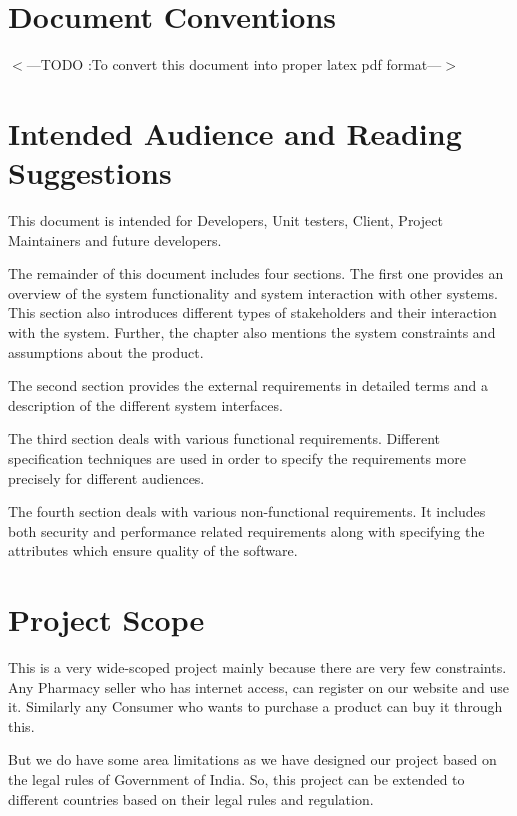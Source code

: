 \documentclass{scrreprt}
\begin{document}
\section{Document Conventions}
$<$---TODO :To convert this document into proper latex pdf format---$>$

\section{Intended Audience and Reading Suggestions}
\item This document is intended for Developers, Unit testers, Client, Project Maintainers and future developers.\\

\item The remainder of this document includes four sections.
The first one provides an overview of the system functionality and system interaction with other systems. This section also introduces different types of stakeholders and their interaction with the system. Further, the chapter also mentions the system constraints and assumptions about the product.\\

\item The second section provides the external requirements in detailed terms and a description of the different system interfaces.\\

\item The third section deals with various functional requirements. Different specification techniques are used in order to specify the requirements more precisely for different audiences.\\

\item The fourth section deals with various non-functional requirements. It includes both security and performance related requirements along with specifying the attributes which ensure quality of the software.

\section{Project Scope}
\item This is a very wide-scoped project mainly because there are very few constraints. Any Pharmacy seller who has internet access, can register on our website and use it. Similarly any Consumer who wants to purchase a product can buy it through this.   
\item But we do have some area limitations as we have designed our project based on the legal rules of Government of India. So, this project can be extended to different countries based on their legal rules and regulation.
\end{document}
